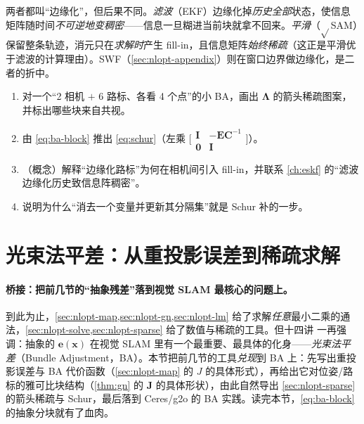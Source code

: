 \begin{pitfall}
两者都叫“边缘化”，但后果不同。\emph{滤波}（EKF）边缘化掉\emph{历史全部}状态，使信息矩阵随时间\emph{不可逆地变稠密}\cite{dellaert2017factor}——信息一旦糊进当前块就拿不回来。\emph{平滑}（$\sqrt{}$SAM）保留整条轨迹，消元只在\emph{求解时}产生 fill-in，且信息矩阵\emph{始终稀疏}（这正是平滑优于滤波的计算理由）。SWF（\cref{sec:nlopt-appendix}）则在窗口边界做边缘化，是二者的折中。
\end{pitfall}

\begin{practice}
\begin{enumerate}
  \item 对一个“2 相机 $+$ 6 路标、各看 4 个点”的小 BA，画出 $\boldsymbol{\Lambda}$ 的箭头稀疏图案，并标出哪些块来自共视。
  \item 由 \cref{eq:ba-block} 推出 \cref{eq:schur}（左乘 $\big[\begin{smallmatrix}\mathbf{I}&-\mathbf{E}\mathbf{C}^{-1}\\\mathbf{0}&\mathbf{I}\end{smallmatrix}\big]$）。
  \item （概念）解释“边缘化路标”为何在相机间引入 fill-in，并联系 \cref{ch:eskf} 的“滤波边缘化历史致信息阵稠密”。
  \item 说明为什么“消去一个变量并更新其分隔集”就是 Schur 补的一步。
\end{enumerate}
\end{practice}

\section{光束法平差：从重投影误差到稀疏求解}
\label{sec:nlopt-ba}

\paragraph{桥接：把前几节的“抽象残差”落到视觉 SLAM 最核心的问题上。}
到此为止，\cref{sec:nlopt-map,sec:nlopt-gn,sec:nlopt-lm} 给了求解\emph{任意}最小二乘的通法，\cref{sec:nlopt-solve,sec:nlopt-sparse} 给了数值与稀疏的工具。但十四讲\cite{gaoxiang2019slam14} 一再强调：抽象的 $\mathbf{e}(\mathbf{x})$ 在视觉 SLAM 里有一个最重要、最具体的化身——\emph{光束法平差}（Bundle Adjustment，BA）。本节把前几节的工具\emph{兑现}到 BA 上：先写出重投影误差与 BA 代价函数（\cref{sec:nlopt-map} 的 $J$ 的具体形式），再给出它对位姿/路标的雅可比块结构（\cref{thm:gn} 的 $\mathbf{J}$ 的具体形状），由此自然导出 \cref{sec:nlopt-sparse} 的箭头稀疏与 Schur，最后落到 Ceres/g2o 的 BA 实践。读完本节，\cref{eq:ba-block} 的抽象分块就有了血肉。

